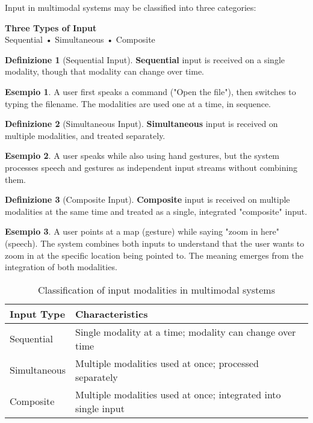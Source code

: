 \documentclass[11pt,a4paper]{article}
\theoremstyle{definition}
\newtheorem{definition}{Definizione}[section]
\newtheorem{example}{Esempio}[section]
\theoremstyle{plain}
\theoremstyle{remark}
\begin{document}
Input in multimodal systems may be classified into three categories:

\begin{center}
\colorbox{orange!15}{\parbox{0.9\textwidth}{
\centering
\textbf{Three Types of Input}\\[0.2cm]
Sequential • Simultaneous • Composite
}}
\end{center}

\begin{definition}[Sequential Input]
\textbf{Sequential} input is received on a single modality, though that modality can change over time.
\end{definition}

\begin{example}
A user first speaks a command ("Open the file"), then switches to typing the filename. The modalities are used one at a time, in sequence.
\end{example}

\begin{definition}[Simultaneous Input]
\textbf{Simultaneous} input is received on multiple modalities, and treated separately.
\end{definition}

\begin{example}
A user speaks while also using hand gestures, but the system processes speech and gestures as independent input streams without combining them.
\end{example}

\begin{definition}[Composite Input]
\textbf{Composite} input is received on multiple modalities at the same time and treated as a single, integrated "composite" input.
\end{definition}

\begin{example}
A user points at a map (gesture) while saying "zoom in here" (speech). The system combines both inputs to understand that the user wants to zoom in at the specific location being pointed to. The meaning emerges from the integration of both modalities.
\end{example}

\begin{table}[h]
\centering
\begin{tabular}{|l|p{10cm}|}
\hline
\textbf{Input Type} & \textbf{Characteristics} \\
\hline
Sequential & Single modality at a time; modality can change over time \\
\hline
Simultaneous & Multiple modalities used at once; processed separately \\
\hline
Composite & Multiple modalities used at once; integrated into single input \\
\hline
\end{tabular}
\caption{Classification of input modalities in multimodal systems}
\end{table}
\end{document}

